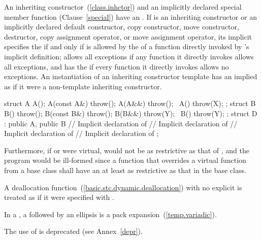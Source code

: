 \pnum
An inheriting constructor~(\ref{class.inhctor}) and an implicitly declared
special member function (Clause~\ref{special}) have an
.
If
is an inheriting constructor or an implicitly declared default constructor,
copy constructor,
move constructor,
destructor,
copy assignment operator,
or move assignment operator,
its implicit
 specifies
the
if and only if
is allowed by the  of a function directly
invoked by 's
implicit
definition;
allows all exceptions if any function it directly invokes allows all
exceptions, and
has the   if every function it directly invokes allows no
exceptions.
\enternote An instantiation of an inheriting constructor template has
an implied  as if it were a non-template
inheriting constructor.\exitnote
\enterexample
\begin{codeblock}
struct A {
  A();
  A(const A&) throw();
  A(A&&) throw();
  ~A() throw(X);
};
struct B {
  B() throw();
  B(const B&) throw();
  B(B&&) throw(Y);
  ~B() throw(Y);
};
struct D : public A, public B {
    // Implicit declaration of 
    // Implicit declaration of 
    // Implicit declaration of 
    // Implicit declaration of 
};
\end{codeblock}

Furthermore, if
or
were virtual,
would not be as restrictive as that of
,
and the program would be ill-formed since a function that overrides a virtual
function from a base class shall have an 
 at least as restrictive as that in the base class.
\exitexample

\pnum
A deallocation function~(\ref{basic.stc.dynamic.deallocation}) with no explicit 
 is treated as if it were specified with
.

\pnum
In a , a
 followed by an ellipsis is a
pack expansion~(\ref{temp.variadic}).

\pnum
\enternote The use of  is deprecated
(see Annex~\ref{depr}). \exitnote%

